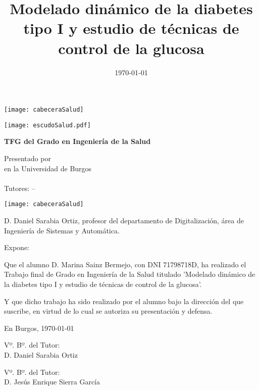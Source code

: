 \documentclass[a4paper,12pt,twoside]{memoir}
\title{Modelado dinámico de la diabetes tipo I y estudio de técnicas de control de la glucosa}
\author{\nombre}
\date{\today}
\makeatletter
\def\maketitle{
  \null
  \thispagestyle{empty}
\begin{center}
  \noindent\texttt{[image: cabeceraSalud]}\vspace{1.5cm}%
\end{center}
  
  \begin{center}
    \begin{minipage}[c][1.5cm][c]{.20\textwidth}
        \texttt{[image: escudoSalud.pdf]}
    \end{minipage}
  \end{center}
  
  \begin{center}
    \colorbox{cpardoBox}{%
        \begin{minipage}{.8\textwidth}
          \vspace{.5cm}\Large
          \begin{center}
          \textbf{TFG del Grado en Ingeniería de la Salud}\vspace{.6cm}\\
          \textbf{\LARGE\@title{}}
          \end{center}
          \vspace{.2cm}
        \end{minipage}
    }%
  \end{center}
  
  \begin{center}%
  {%
    \noindent\LARGE
    Presentado por \@author{}\\ 
    en la Universidad de Burgos\\
    \vspace{0.5cm}
    \noindent\Large
    \@date{}\\
    \vspace{0.5cm}
    Tutores: \@tutor{} -- \@tutorb{}\\
  }%
  \end{center}%
  \null
  \cleardoublepage
  }
\newcommand{\nombre}{Marina Sainz Bermejo}
\newcommand{\nombreTutor}{Daniel Sarabia Ortiz}
\newcommand{\nombreTutorb}{Jesús Enrique Sierra García}
\newcommand{\dni}{71798718D}
\makeatother
\begin{document}
\maketitle


\newpage\null\thispagestyle{empty}\newpage

\thispagestyle{empty}


\noindent\texttt{[image: cabeceraSalud]}\vspace{1cm}

\noindent D. \nombreTutor, profesor del departamento de Digitalización, área de Ingeniería de Sistemas y Automática.

\noindent Expone:

\noindent Que el alumno D. \nombre, con DNI \dni, ha realizado el Trabajo final de Grado en Ingeniería de la Salud titulado 'Modelado dinámico de la diabetes tipo I y estudio de técnicas de control de la glucosa'. 

\noindent Y que dicho trabajo ha sido realizado por el alumno bajo la dirección del que suscribe, en virtud de lo cual se autoriza su presentación y defensa.

\begin{center} %
En Burgos, {\large \today}
\end{center}

\vfill\vfill\vfill

\begin{minipage}{0.45\textwidth}
\begin{flushleft} %
Vº. Bº. del Tutor:\\[2cm]
D. \nombreTutor
\end{flushleft}
\end{minipage}
\hfill
\begin{minipage}{0.45\textwidth}
\begin{flushleft} %
Vº. Bº. del Tutor:\\[2cm]
D. \nombreTutorb
\end{flushleft}
\end{minipage}
\hfill

\vfill



\newpage\null\thispagestyle{empty}\newpage
\end{document}
